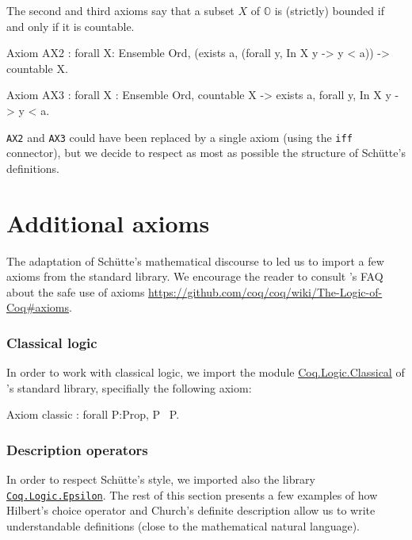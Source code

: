 The second and third axioms say that a subset $X$ of $\mathbb{O}$ is
(strictly) bounded if and only if it is countable. 



\begin{Coqsrc}
Axiom AX2 : forall X: Ensemble Ord, 
   (exists a,  (forall y, In X y -> y < a)) ->
   countable X.

Axiom AX3 : forall X : Ensemble Ord,
              countable X -> 
              exists a,  forall y, In X y -> y < a.
\end{Coqsrc}

\texttt{AX2} and \texttt{AX3} could have been replaced by a single axiom (using the \texttt{iff} connector), but we decide to respect as most as possible the structure of Schütte's definitions.

\section{Additional  axioms}

The adaptation of Schütte's mathematical discourse to \coq{} led us to
import a few axioms from the standard library. We encourage the reader to consult \coq{}'s FAQ about the safe use of axioms
 \url{https://github.com/coq/coq/wiki/The-Logic-of-Coq#axioms}.

\subsubsection{Classical logic}

In order to work with classical logic, we import the module
\href{https://coq.inria.fr/distrib/current/stdlib/Coq.Logic.Classical.html}{Coq.Logic.Classical}  of \coq{}'s standard library, specifially the following axiom:

\begin{Coqsrc}
 Axiom classic : forall P:Prop, P \/ ~P.
\end{Coqsrc}


\subsubsection{Description operators}

In order to respect Schütte's style, we imported also the library 
\href{https://coq.inria.fr/distrib/current/stdlib/Coq.Logic.Epsilon.html}{\texttt{Coq.Logic.Epsilon}}.  The rest of this section presents a few examples of
how Hilbert's choice operator and Church's definite description allow us
 to write understandable definitions (close to the mathematical natural language).


